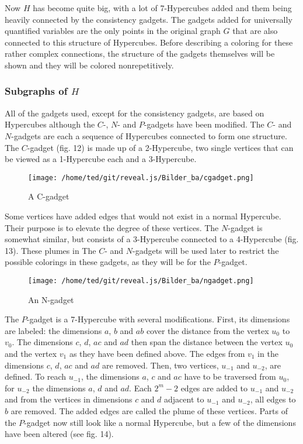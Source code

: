 \documentclass[12pt,a4paper]{article}
\begin{document}
\newline
Now $H$ has become quite big, with a lot of 7-Hypercubes added and them being heavily connected by the consistency gadgets. The gadgets added for universally quantified variables are the only points in the original graph $G$ that are also connected to this structure of Hypercubes. Before describing a coloring for these rather complex connections, the structure of the gadgets themselves will be shown and they will be colored nonrepetitively. 
  
\subsubsection{Subgraphs of $H$}

All of the gadgets used, except for the consistency gadgets, are based on Hypercubes although the $C$-, $N$- and $P$-gadgets have been modified. The $C$- and $N$-gadgets are each a sequence of Hypercubes connected to form one structure. The $C$-gadget (fig. 12) is made up of a 2-Hypercube, two single vertices that can be viewed as a 1-Hypercube each and a 3-Hypercube.
\begin{figure}[h]
\texttt{[image: /home/ted/git/reveal.js/Bilder\_ba/cgadget.png]} 
\caption{A C-gadget \citep{Manin2008}}
\end{figure}
\newline
Some vertices have added edges that would not exist in a normal Hypercube. Their purpose is to elevate the degree of these vertices. The $N$-gadget is somewhat similar, but consists of a 3-Hypercube connected to a 4-Hypercube (fig. 13). These plumes in The $C$- and $N$-gadgets will be used later to restrict the possible colorings in these gadgets, as they will be for the $P$-gadget.
\begin{figure}[h]
\texttt{[image: /home/ted/git/reveal.js/Bilder\_ba/ngadget.png]} 
\caption{An N-gadget \citep{Manin2008}}
\end{figure}
\newline
The $P$-gadget is a 7-Hypercube with several modifications. First, its dimensions are labeled: the dimensions $a$, $b$ and $ab$ cover the distance from the vertex $u_0$ to $v_0$. The dimensions $c$, $d$, $ac$ and $ad$ then span the distance between the vertex $u_0$ and the vertex $v_1$ as they have been defined above. The edges from $v_1$ in the dimensions $c$, $d$, $ac$ and $ad$ are removed. Then, two vertices, $u_{-1}$ and $u_{-2}$, are defined. To reach $u_{-1}$, the dimensions $a$, $c$ and $ac$ have to be traversed from $u_0$, for $u_{-2}$ the dimensions $a$, $d$ and $ad$. Each $2^m-2$ edges are added to $u_{-1}$ and $u_{-2}$ and from the vertices in dimensions $c$ and $d$ adjacent to $u_{-1}$ and $u_{-2}$, all edges to $b$ are removed. The added edges are called the plume of these vertices. Parts of the $P$-gadget now still look like a normal Hypercube, but a few of the dimensions have been altered (see fig. 14).
\end{document}
